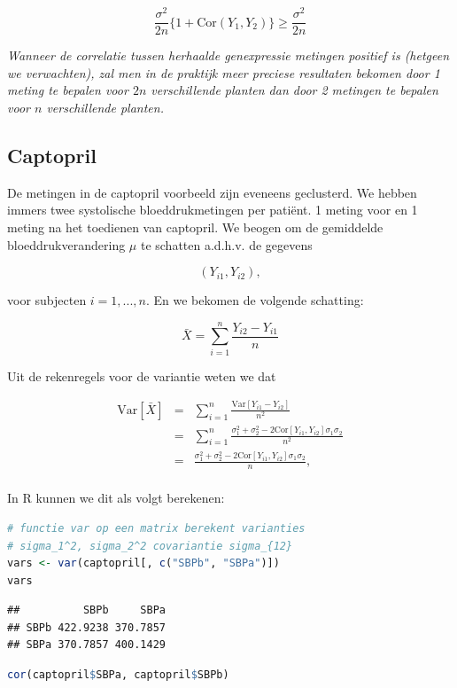 \documentclass[
  12pt,dutch,coursenotes]{book}
\theoremstyle{definition}
\theoremstyle{definition}
\theoremstyle{definition}
\theoremstyle{definition}
\theoremstyle{remark}
\begin{document}
\[\frac{\sigma^2}{2n}\{1+\text{Cor}(Y_{1},Y_{2})\}\geq \frac{\sigma^2}{2n}\]

\emph{Wanneer de correlatie tussen herhaalde genexpressie metingen positief is (hetgeen we verwachten), zal men in de praktijk meer preciese resultaten bekomen door 1 meting te bepalen voor \(2n\) verschillende planten dan door 2 metingen te bepalen voor \(n\) verschillende planten.}

\hypertarget{captopril}{%
\subsection{Captopril}\label{captopril}}

De metingen in de captopril voorbeeld zijn eveneens geclusterd. We hebben immers twee systolische bloeddrukmetingen per patiënt.
1 meting voor en 1 meting na het toedienen van captopril.
We beogen om de gemiddelde bloeddrukverandering \(\mu\) te schatten a.d.h.v. de gegevens

\[(Y_{i1} , Y_{i2}),\]

voor subjecten \(i = 1, ..., n\).
En we bekomen de volgende schatting:

\[\bar X = \sum_{i=1}^n \frac{Y_{i2}-Y_{i1}}{n}\]

Uit de rekenregels voor de variantie weten we dat

\begin{eqnarray*}
\text{Var}\left[\bar X\right]&=&\sum_{i=1}^n \frac{\text{Var}\left[Y_{i1}-Y_{i2}\right]}{n^2}\\
&=&\sum_{i=1}^n \frac{\sigma^2_1+\sigma^2_2-2\text{Cor}\left[Y_{i1},Y_{i2}\right]\sigma_1\sigma_2}{n^2}\\
&=&\frac{\sigma^2_1+\sigma^2_2-2\text{Cor}\left[Y_{i1},Y_{i2}\right]\sigma_1\sigma_2}{n},\\
\end{eqnarray*}

In R kunnen we dit als volgt berekenen:

\begin{lstlisting}[language=R]
# functie var op een matrix berekent varianties
# sigma_1^2, sigma_2^2 covariantie sigma_{12}
vars <- var(captopril[, c("SBPb", "SBPa")])
vars
\end{lstlisting}

\begin{lstlisting}
##          SBPb     SBPa
## SBPb 422.9238 370.7857
## SBPa 370.7857 400.1429
\end{lstlisting}

\begin{lstlisting}[language=R]
cor(captopril$SBPa, captopril$SBPb)
\end{lstlisting}
\end{document}
